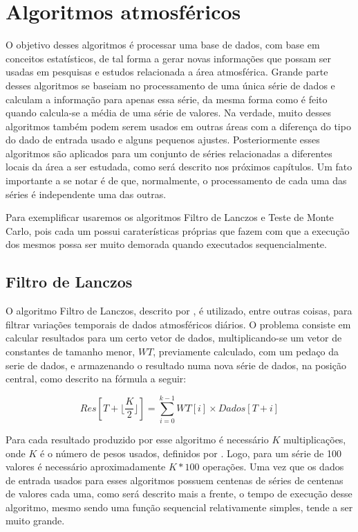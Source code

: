 \chapter{Algoritmos atmosféricos}\label{cap:algs_atmosfericos}

O objetivo desses algoritmos é processar uma base de dados, com base em conceitos estatísticos, de tal forma a gerar novas informações que possam ser usadas em pesquisas e estudos relacionada a área atmosférica. Grande parte desses algoritmos se baseiam no processamento de uma única série de dados e calculam a informação para apenas essa série, da mesma forma como é feito quando calcula-se a média de uma série de valores. Na verdade, muito desses algoritmos também podem serem usados em outras áreas com a diferença do tipo do dado de entrada usado e alguns pequenos ajustes. Posteriormente esses algoritmos são aplicados para um conjunto de séries relacionadas a diferentes locais da área a ser estudada, como será descrito nos próximos capítulos. Um fato importante a se notar é de que, normalmente, o processamento de cada uma das séries é independente uma das outras. 

Para exemplificar usaremos os algoritmos Filtro de Lanczos e Teste de Monte Carlo, pois cada um possui caraterísticas próprias que fazem com que a execução dos mesmos possa ser muito demorada quando executados sequencialmente.

\section{Filtro de Lanczos}

O algoritmo Filtro de Lanczos, descrito por \cite{Duchon:1979}, é utilizado, entre outras coisas, para filtrar variações temporais de dados atmosféricos diários. O problema consiste em calcular resultados para um certo vetor de dados, multiplicando-se um vetor de constantes de tamanho menor, $WT$, previamente calculado, com um pedaço da serie de dados, e armazenando o resultado numa nova série de dados, na posição central, como descrito na fórmula a seguir:

\[ Res[T+ \lfloor \frac{K}{2} \rfloor ]=\sum _{i=0} ^{k-1} WT[i] \times Dados[T+i] \]

Para cada resultado produzido por esse algoritmo é necessário $K$ multiplicações, onde $K$ é o número de pesos usados, definidos por \cite{Duchon:1979}. Logo, para um série de 100 valores é necessário aproximadamente $K*100$ operações. Uma vez que os dados de entrada usados para esses algoritmos possuem centenas de séries de centenas de valores cada uma, como será descrito mais a frente, o tempo de execução desse algoritmo, mesmo sendo uma função sequencial relativamente simples, tende a ser muito grande.

